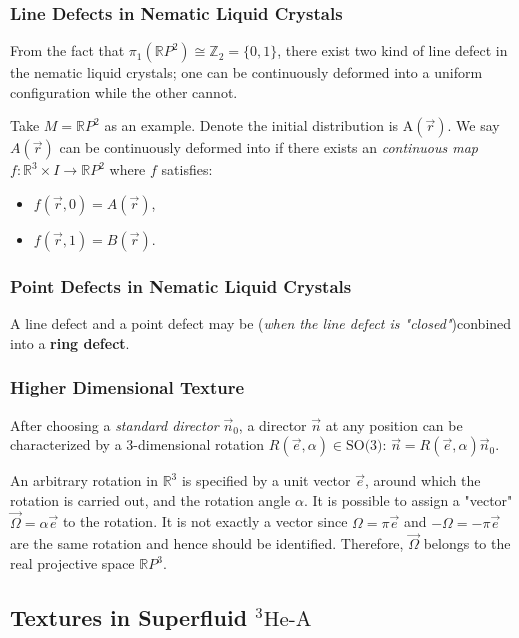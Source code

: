 \documentclass[10pt]{article}
\begin{document}
\subsubsection{Line Defects in Nematic Liquid Crystals}
From the fact that $\pi_1(\mathbb{R}P^2)\cong\mathbb{Z}_2=\{0,1\}$, there exist two kind of line defect in the nematic liquid crystals;
one can be continuously deformed into a uniform configuration while the other cannot.
\begin{remark}
    Take $M=\mathbb{R}P^2$ as an example.
    Denote the initial distribution is A$(\vec{r})$.
    We say $A(\vec{r})$ can be continuously deformed into if there exists an \textit{continuous map} $f:\mathbb{R}^3\times I\to\mathbb{R}P^2$ where $f$ satisfies:
    \begin{itemize}
        \item $f(\vec{r},0)=A(\vec{r})$,
        \item $f(\vec{r},1)=B(\vec{r})$.
    \end{itemize}
\end{remark}

\subsubsection{Point Defects in Nematic Liquid Crystals}
A line defect and a point defect may be (\textit{when the line defect is "closed"})conbined into a \textbf{ring defect}.

\subsubsection{Higher Dimensional Texture}
After choosing a \textit{standard director} $\vec{n}_0$, a director $\vec{n}$ at any position can be characterized by a 3-dimensional rotation $R(\vec{e},\alpha)\in\text{SO(3)}$: $\vec{n}=R(\vec{e},\alpha)\vec{n}_0$.

An arbitrary rotation in $\mathbb{R}^3$ is specified by a unit vector $\vec{e}$, around which the rotation is carried out, and the rotation angle $\alpha$.
It is possible to assign a "vector" $\vec{\Omega}=\alpha \vec{e}$ to the rotation.
It is not exactly a vector since $\Omega =\pi\vec{e}$ and $-\Omega=-\pi\vec{e}$ are the same rotation and hence should be identified.
Therefore, $\vec{\Omega}$ belongs to the real projective space $\mathbb{R}P^3$.

\subsection{Textures in Superfluid \texorpdfstring{{}$^3\text{He-A}$}{}}
\end{document}
